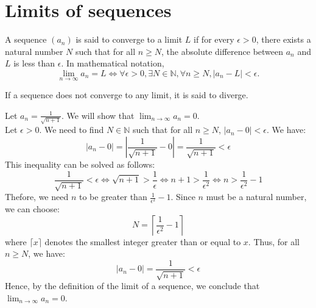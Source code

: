 \section{Limits of sequences}
\begin{definition}
    A sequence \( (a_n) \) is said to converge to a limit \( L \) if for every \( \epsilon > 0 \), there exists a natural number \( N \) such that for all \( n \geq N \), the absolute difference between \( a_n \) and \( L \) is less than \( \epsilon \). In mathematical notation,
    \[\lim_{n \to \infty} a_n = L \iff \forall \epsilon > 0, \exists N \in \mathbb{N}, \forall n \geq N, |a_n - L| < \epsilon.\]

    \begin{center}
    \end{center}
\end{definition}
If a sequence does not converge to any limit, it is said to diverge.

\begin{eg}
    Let $a_n = \frac{1}{\sqrt{n + 1}}$. We will show that \( \lim_{n \to \infty} a_n = 0 \). \\
    Let \( \epsilon > 0 \). We need to find \( N \in \mathbb{N} \) such that for all \( n \geq N \), \( |a_n - 0| < \epsilon \). We have:
    \[|a_n - 0| = \left|\frac{1}{\sqrt{n + 1}} - 0\right| = \frac{1}{\sqrt{n + 1}} < \epsilon \]
    This inequality can be solved as follows:
    \[
        \frac{1}{\sqrt{n + 1}} < \epsilon \iff \sqrt{n + 1} > \frac{1}{\epsilon} \iff n + 1 > \frac{1}{\epsilon^2} \iff n > \frac{1}{\epsilon^2} - 1
    \]
    Thefore, we need \( n \) to be greater than \( \frac{1}{\epsilon^2} - 1 \). Since \( n \) must be a natural number, we can choose:
    \[ N = \left\lceil \frac{1}{\epsilon^2} - 1 \right\rceil \]
    where \( \lceil x \rceil \) denotes the smallest integer greater than or equal to \( x \). Thus, for all \( n \geq N \), we have:
    \[ |a_n - 0| = \frac{1}{\sqrt{n + 1}} < \epsilon \]
    Hence, by the definition of the limit of a sequence, we conclude that \( \lim_{n \to \infty} a_n = 0 \).
\end{eg}

